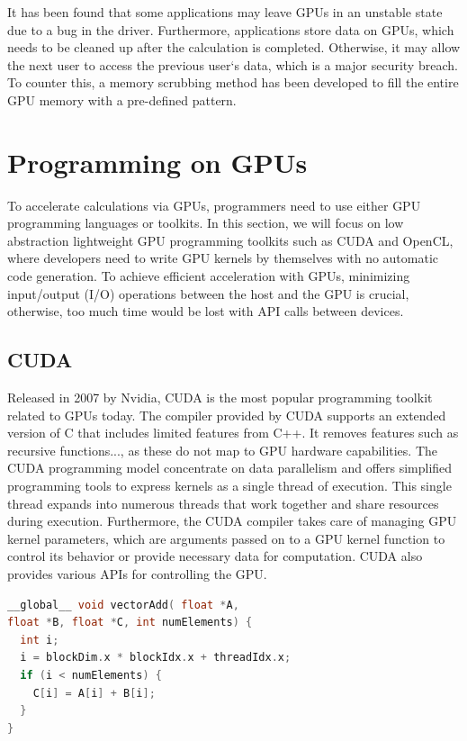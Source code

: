 \documentclass[conference]{IEEEtran}
\begin{document}
It has been found that some applications may leave GPUs in an unstable state due to a bug in the driver. Furthermore, applications store data on GPUs, which needs to be cleaned up after the calculation is completed. Otherwise, it may allow the next user to access the previous user`s data, which is a major security breach. To counter this, a memory scrubbing method has been developed to fill the entire GPU memory with a pre-defined pattern.  \cite{b5}

\section{Programming on GPUs}
To accelerate calculations via GPUs, programmers need to use either GPU programming languages or toolkits. In this section, we will focus on low abstraction lightweight GPU programming toolkits such as CUDA and OpenCL, where developers need to write GPU kernels by themselves with no automatic code generation. To achieve efficient acceleration with GPUs, minimizing input/output (I/O) operations between the host and the GPU is crucial, otherwise, too much time would be lost with API calls between devices.
\subsection{CUDA}
Released in 2007 by Nvidia, CUDA is the most popular programming toolkit related to GPUs today. The compiler provided by CUDA supports an extended version of C that includes limited features from C++. It removes features such as recursive functions..., as these do not map to GPU hardware capabilities. The CUDA programming model concentrate on data parallelism and offers simplified programming tools to express kernels as a single thread of execution. This single thread expands into numerous threads that work together and share resources during execution. Furthermore, the CUDA compiler takes care of managing GPU kernel parameters, which are arguments passed on to a GPU kernel function to control its behavior or provide necessary data for computation. CUDA also provides various APIs for controlling the GPU. \cite{b3}



\begin{lstlisting}[language=C++, basicstyle=\ttfamily\small\lst@ifdisplaystyle\fontsize{8.9}{10.5}\fi
, caption=The function vectorAdd performs vector addition on the vectors A and B and stores the result in C. The arguments are given as pointers and the vector size is also supplied. \cite{b16}
,captionpos=b, label=lst:vector-add]
__global__ void vectorAdd( float *A,
float *B, float *C, int numElements) {
  int i;
  i = blockDim.x * blockIdx.x + threadIdx.x;
  if (i < numElements) {
    C[i] = A[i] + B[i];
  }
}
\end{lstlisting}
\end{document}
